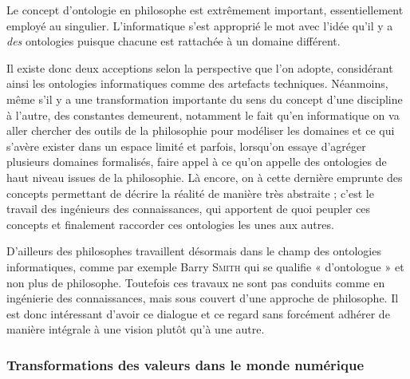 
Le concept d'ontologie en philosophe est extrêmement important, essentiellement employé au singulier. L'informatique s'est approprié le mot avec l'idée qu'il y a \emph{des} ontologies puisque chacune est rattachée à un domaine différent.

Il existe donc deux acceptions selon la perspective que l'on adopte, considérant ainsi les ontologies informatiques comme des artefacts techniques. Néanmoins, même s'il y a une transformation importante du sens du concept d'une discipline à l'autre, des constantes demeu\-rent, notamment le fait qu'en informatique on va aller chercher des outils de la philosophie pour modéliser les domaines et ce qui s'avère exister dans un espace limité et parfois, lorsqu'on essaye d'agréger plusieurs domaines formalisés, faire appel à ce qu'on appelle des ontologies de haut niveau issues de la philosophie. Là encore, on à cette dernière emprunte des concepts permettant de décrire la réalité de manière très abstraite ; c'est le travail des ingénieurs des connaissances, qui apportent de quoi peupler ces concepts et finalement raccorder ces ontologies les unes aux autres.

D'ailleurs des philosophes travaillent désormais dans le champ des ontologies informatiques, comme par exemple Barry \textsc{Smith} qui se qualifie « d'ontologue » et non plus de philosophe. Toutefois ces travaux ne sont pas conduits comme en ingénierie des connaissances, mais sous couvert d'une approche de philosophe. Il est donc intéressant d'avoir ce dialogue et ce regard sans forcément adhérer de manière intégrale à une vision plutôt qu'à une autre. 


\subsubsection[Transformations]{Transformations des valeurs dans le monde numérique}
\label{subsub:II.4.1.2}

